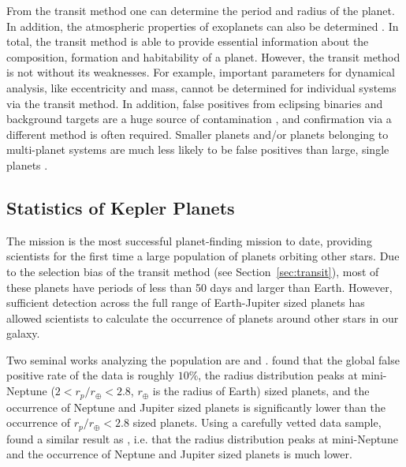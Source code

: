 From the transit method one can determine the period and radius of the planet. 
In addition, the atmospheric properties of exoplanets can also be determined \citep{Kreidberg2014, Tsiaras2016, Stevenson2016}.
In total, the transit method is able to provide essential information about the composition, formation and habitability of a planet. 
However, the transit method is not without its weaknesses. 
For example, important parameters for dynamical analysis, like eccentricity and mass, cannot be determined for individual systems via the transit method.
In addition, false positives from eclipsing binaries and background targets are a huge source of contamination \citep{Fressin2013}, and confirmation via a different method is often required. 
Smaller planets and/or planets belonging to multi-planet systems are much less likely to be false positives than large, single planets \citep{Fressin2013}.

\subsection{Statistics of Kepler Planets}
\label{sec:stats}
The \kep mission is the most successful planet-finding mission to date, providing scientists for the first time a large population of planets orbiting other stars. 
Due to the selection bias of the transit method (see Section~\ref{sec:transit}), most of these planets have periods of less than 50 days and larger than Earth. 
However, sufficient detection across the full range of Earth-Jupiter sized planets has allowed scientists to calculate the occurrence of planets around other stars in our galaxy. 

Two seminal works analyzing the \kep population are \citet{Fressin2013} and \citet{Petigura2013}.
\citet{Fressin2013} found that the global false positive rate of the \kep data is roughly $10\%$, the radius distribution peaks at mini-Neptune ($2<r_p/r_{\oplus}<2.8$, $r_{\oplus}$ is the radius of Earth) sized planets, and the occurrence of Neptune and Jupiter sized planets is significantly lower than the occurrence of $r_p/r_{\oplus}<2.8$ sized planets.
Using a carefully vetted data sample, \citet{Petigura2013} found a similar result as \citet{Fressin2013}, i.e. that the radius distribution peaks at mini-Neptune and the occurrence of Neptune and Jupiter sized planets is much lower.

